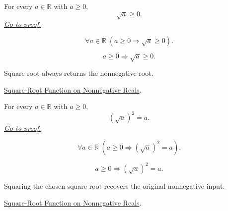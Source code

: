 \begin{theorem}
\label{thm:sqrt-nonnegative}
For every $a\in\mathbb{R}$ with $a\ge0$,
\[
\sqrt a\ge0.
\]
\hyperref[prf:sqrt-nonnegative]{\textit{Go to proof.}}
\end{theorem}
\begin{remark*}
\[
\forall a\in\mathbb{R}\;(a\ge0\Rightarrow \sqrt a\ge0).
\]
\end{remark*}
\begin{remark*}
\[
a\ge0\Rightarrow \sqrt a\ge0.
\]
\end{remark*}
\begin{remark*}[Interpretation]
Square root always returns the nonnegative root.
\end{remark*}
\begin{dependencies}
\hyperref[def:real-square-root-function]{Square-Root Function on Nonnegative Reals}.
\end{dependencies}

\begin{theorem}
\label{thm:sqrt-square}
For every $a\in\mathbb{R}$ with $a\ge0$,
\[
(\sqrt a)^2=a.
\]
\hyperref[prf:sqrt-square]{\textit{Go to proof.}}
\end{theorem}
\begin{remark*}
\[
\forall a\in\mathbb{R}\;(a\ge0\Rightarrow(\sqrt a)^2=a).
\]
\end{remark*}
\begin{remark*}
\[
a\ge0\Rightarrow(\sqrt a)^2=a.
\]
\end{remark*}
\begin{remark*}[Interpretation]
Squaring the chosen square root recovers the original nonnegative input.
\end{remark*}
\begin{dependencies}
\hyperref[def:real-square-root-function]{Square-Root Function on Nonnegative Reals}.
\end{dependencies}

